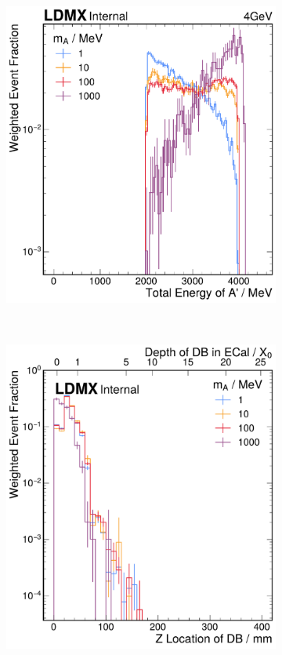 \begin{figure}
  \centering
  \begin{subfigure}{0.48\textwidth}
    \includegraphics[width=\textwidth]{figures/ldmx/simulation/ap_energy.pdf}
  \end{subfigure}
  ~
  \begin{subfigure}{0.48\textwidth}
    \includegraphics[width=\textwidth]{figures/ldmx/simulation/db_z.pdf}

\end{subfigure}
\end{figure}
